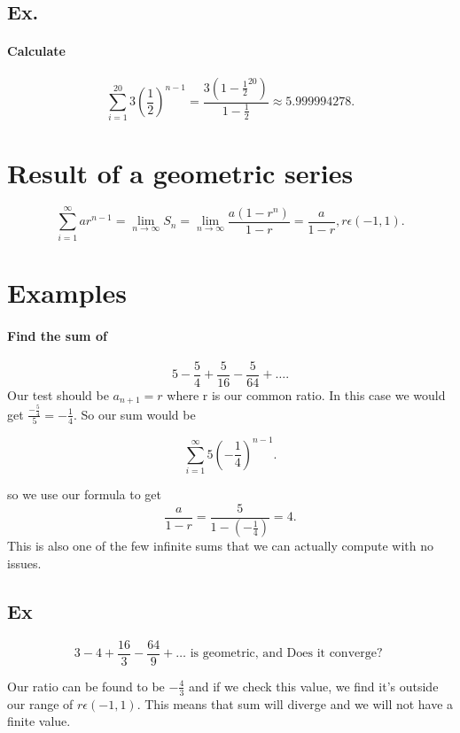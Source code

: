 \subsection{Ex.}%
\label{sub:Ex.}
\paragraph{Calculate}
\[
\sum_{ i=1 } ^{ 20 } 3\left( \frac{ 1 }{ 2 }  \right) ^{ n-1 }=\frac{ 3\left( 1-\frac{ 1 }{ 2 }^{ 20 }  \right)  }{ 1-\frac{ 1 }{ 2 }  }	\approx 5.999994278
.\] 

\section{Result of a geometric series}%
\[
\sum_{ i=1 } ^{ \infty } ar^{ n-1 }=\lim_{ n \to \infty} S_n=\lim_{ n \to \infty} \frac{ a\left( 1-r^{ n } \right)  }{ 1-r }=\frac{ a }{ 1-r } ,r\epsilon\left( -1,1 \right) 
.\] 

\section{Examples}%
\label{sec:Examples}
\paragraph{Find the sum of }
\[
5-\frac{ 5 }{ 4 } +\frac{ 5 }{ 16 } -\frac{ 5 }{ 64 } + \ldots
.\] 
Our test should be $ a_{ n+1 } = r $ where r is our common ratio. In this case we would get $ \frac{ -\frac{ 5 }{ 4 }  }{ 5 } = -\frac{ 1 }{ 4 } $. So our sum would be

\[
\sum_{ i=1 } ^{ \infty } 5\left( -\frac{ 1 }{ 4 }  \right) ^{ n-1 }
.\] 

so we use our formula to get
\[
\frac{ a }{ 1-r } =\frac{ 5 }{ 1-\left( -\frac{ 1 }{ 4 }  \right)  } =4
.\] 
This is also one of the few infinite sums that we can actually compute with no issues. 

\newpage
\subsection{Ex}%
\label{sub:Ex}
\[
3-4+\frac{ 16 }{ 3 } -\frac{ 64 }{ 9 } +\ldots \text{ is geometric, and Does it converge? }
\] 

Our ratio can be found to be $ -\frac{ 4 }{ 3 }  $ and if we check this value, we find it's outside our range of $ r\epsilon\left( -1,1 \right)  $. This means that sum will diverge and we will not have a finite value. 

